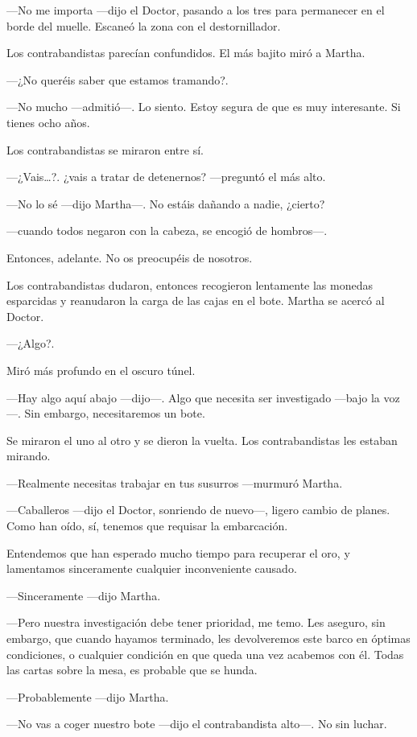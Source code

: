 ---No me importa ---dijo el Doctor, pasando a los tres para permanecer en el borde del muelle. Escaneó la zona con el destornillador.

Los contrabandistas parecían confundidos. El más bajito miró a Martha.

---¿No queréis saber que estamos tramando?.

---No mucho ---admitió---. Lo siento. Estoy segura de que es muy interesante. Si tienes ocho años.

Los contrabandistas se miraron entre sí.

---¿Vais\ldots{}?. ¿vais a tratar de detenernos? ---preguntó el más alto.

---No lo sé ---dijo Martha---. No estáis dañando a nadie, ¿cierto?

---cuando todos negaron con la cabeza, se encogió de hombros---.

Entonces, adelante. No os preocupéis de nosotros.

Los contrabandistas dudaron, entonces recogieron lentamente las monedas esparcidas y reanudaron la carga de las cajas en el bote. Martha se acercó al Doctor.

---¿Algo?.

Miró más profundo en el oscuro túnel.

---Hay algo aquí abajo ---dijo---. Algo que necesita ser investigado ---bajo la voz---. Sin embargo, necesitaremos un bote.

Se miraron el uno al otro y se dieron la vuelta. Los contrabandistas les estaban mirando.

---Realmente necesitas trabajar en tus susurros ---murmuró Martha.

---Caballeros ---dijo el Doctor, sonriendo de nuevo---, ligero cambio de planes. Como han oído, sí, tenemos que requisar la embarcación.

Entendemos que han esperado mucho tiempo para recuperar el oro, y lamentamos sinceramente cualquier inconveniente causado.

---Sinceramente ---dijo Martha.

---Pero nuestra investigación debe tener prioridad, me temo. Les aseguro, sin embargo, que cuando hayamos terminado, les devolveremos este barco en óptimas condiciones, o cualquier condición en que queda una vez acabemos con él. Todas las cartas sobre la mesa, es probable que se hunda.

---Probablemente ---dijo Martha.

---No vas a coger nuestro bote ---dijo el contrabandista alto---. No sin luchar.

